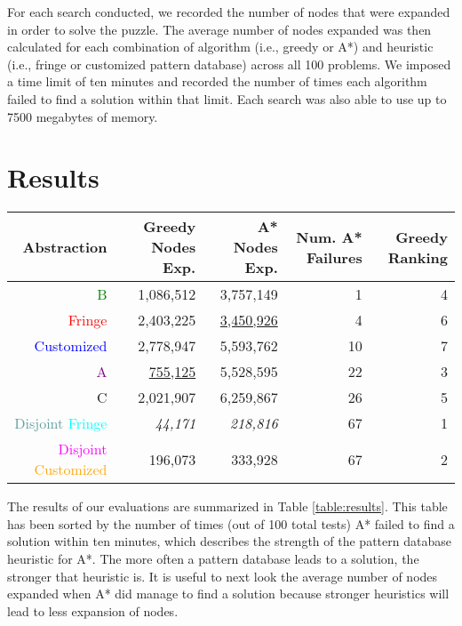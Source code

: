 \documentclass[letterpaper]{article}
\begin{document}
For each search conducted, we recorded the number of nodes that were expanded in order to solve the puzzle.  The average number of nodes expanded was then calculated for each combination of algorithm (i.e., greedy or A*) and heuristic (i.e., fringe or customized pattern database) across all 100 problems.  We imposed a time limit of ten minutes and recorded the number of times each algorithm failed to find a solution within that limit.  Each search was also able to use up to 7500 megabytes of memory.

\section{Results}

\begin{table*}
\centering
\begin{tabular}{ r | r | r | r | r }
      Abstraction  & Greedy Nodes Exp.     & A* Nodes Exp. & Num. A* Failures & Greedy Ranking\\ \hline 
\textcolor{green}{B}                                         &  1,086,512  & 3,757,149 &  1 & 4\\ 
\textcolor{red}{Fringe}                                      &  2,403,225  & \underline{3,450,926} &  4 & 6\\ 
\textcolor{blue}{Customized}                                 &  2,778,947  & 5,593,762 & 10 & 7\\ 
\textcolor{Purple}{A}                                        &    \underline{755,125}  & 5,528,595 & 22 & 3\\ 
\textcolor{RawSienna}{C}                                     &  2,021,907  & 6,259,867 & 26 & 5\\ 
\textcolor{CadetBlue}{Disjoint} \textcolor{cyan}{Fringe}           &     \textit{44,171}  &   \textit{218,816} & 67 & 1\\ 
\textcolor{magenta}{Disjoint} \textcolor{orange}{Customized} &    196,073  &   333,928 & 67 & 2\\ 
\end{tabular}
\caption{average number of nodes expanded, sorted by the number of times A* failed to find a solution.}
\label{table:results}
\end{table*}

The results of our evaluations are summarized in Table \ref{table:results}.  This table has been sorted by the number of times (out of 100 total tests) A* failed to find a solution within ten minutes, which describes the strength of the pattern database heuristic for A*.  The more often a pattern database leads to a solution, the stronger that heuristic is.  It is useful to next look the average number of nodes expanded when A* did manage to find a solution because stronger heuristics will lead to less expansion of nodes.
\end{document}
